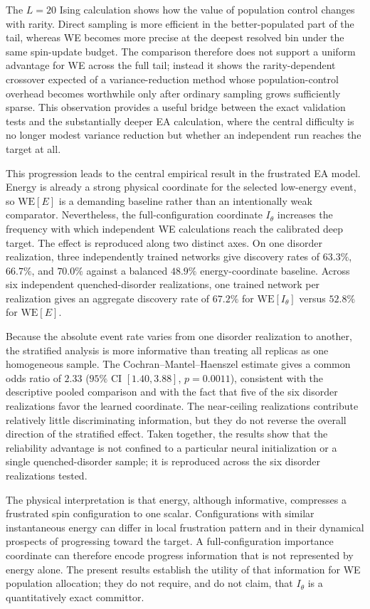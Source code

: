 \documentclass[a4paper,fleqn]{cas-sc}
\newcommand{\WE}{\mathrm{WE}}
\begin{document}
The $L=20$ Ising calculation shows how the value of population control changes with rarity.
Direct sampling is more efficient in the better-populated part of the tail, whereas WE becomes
more precise at the deepest resolved bin under the same spin-update budget. The comparison
therefore does not support a uniform advantage for WE across the full tail; instead it shows the
rarity-dependent crossover expected of a variance-reduction method whose population-control
overhead becomes worthwhile only after ordinary sampling grows sufficiently sparse. This
observation provides a useful bridge between the exact validation tests and the substantially
deeper EA calculation, where the central difficulty is no longer modest variance reduction but
whether an independent run reaches the target at all.

This progression leads to the central empirical result in the frustrated EA model.\label{sec:whymatters} Energy is already a strong
physical coordinate for the selected low-energy event, so $\WE[E]$ is a demanding baseline
rather than an intentionally weak comparator. Nevertheless, the full-configuration coordinate
$I_\theta$ increases the frequency with which independent WE calculations reach the calibrated
deep target. The effect is reproduced along two distinct axes. On one disorder realization,
three independently trained networks give discovery rates of $63.3\%$, $66.7\%$, and $70.0\%$
against a balanced $48.9\%$ energy-coordinate baseline. Across six independent quenched-disorder
realizations, one trained network per realization gives an aggregate discovery rate of $67.2\%$
for $\WE[I_\theta]$ versus $52.8\%$ for $\WE[E]$.

Because the absolute event rate varies from one disorder realization to another, the
stratified analysis is more informative than treating all replicas as one homogeneous sample.
The Cochran--Mantel--Haenszel estimate gives a common odds ratio of $2.33$ ($95\%$ CI
$[1.40,3.88]$, $p=0.0011$), consistent with the descriptive pooled comparison and with the
fact that five of the six disorder realizations favor the learned coordinate. The near-ceiling
realizations contribute relatively little discriminating information, but they do not reverse
the overall direction of the stratified effect. Taken together, the results show that the
reliability advantage is not confined to a particular neural initialization or a single
quenched-disorder sample; it is reproduced across the six disorder realizations tested.

The physical interpretation is that energy, although informative, compresses a frustrated spin
configuration to one scalar. Configurations with similar instantaneous energy can differ in
local frustration pattern and in their dynamical prospects of progressing toward the target.
A full-configuration importance coordinate can therefore encode progress information that is
not represented by energy alone. The present results establish the utility of that information
for WE population allocation; they do not require, and do not claim, that $I_\theta$ is a
quantitatively exact committor.
\end{document}

